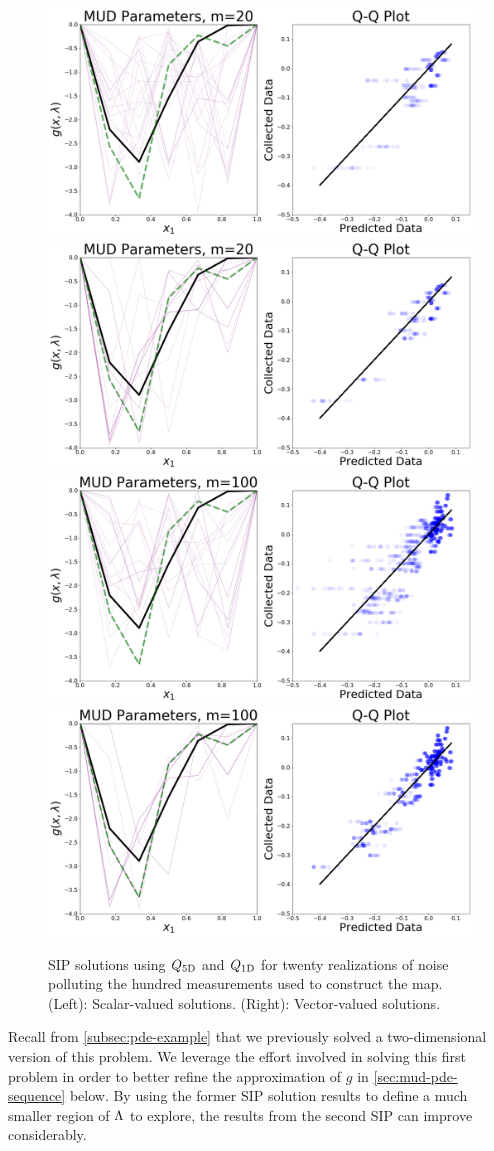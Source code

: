 \begin{figure}
\centering
\includegraphics[width=0.45\linewidth]{figures/pde-highd/pde-highd_pair_D5-1_m20}
\includegraphics[width=0.45\linewidth]{figures/pde-highd/pde-highd_pair_D5-5_m20}
  \includegraphics[width=0.45\linewidth]{figures/pde-highd/pde-highd_pair_D5-1_m100}
  \includegraphics[width=0.45\linewidth]{figures/pde-highd/pde-highd_pair_D5-5_m100}
\caption{ SIP solutions using $Q_\text{5D}$ and $Q_\text{1D}$ for twenty realizations of noise polluting the hundred measurements used to construct the map.
(Left): Scalar-valued solutions.
(Right): Vector-valued solutions.
}
\label{fig:pde-highd-5d-mud}
\end{figure}


Recall from \ref{subsec:pde-example} that we previously solved a two-dimensional version of this problem.
We leverage the effort involved in solving this first problem in order to better refine the approximation of $g$ in \ref{sec:mud-pde-sequence} below.
By using the former SIP solution results to define a much smaller region of ${\Lambda}$ to explore, the results from the second SIP can improve considerably.
